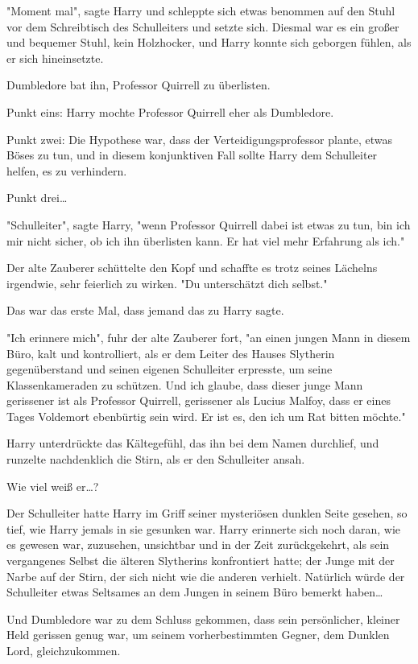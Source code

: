 {"Moment mal", sagte Harry und schleppte sich etwas benommen auf den Stuhl vor dem Schreibtisch des Schulleiters und setzte sich. Diesmal war es ein großer und bequemer Stuhl, kein Holzhocker, und Harry konnte sich geborgen fühlen, als er sich hineinsetzte.

Dumbledore bat ihn, Professor Quirrell zu überlisten.

Punkt eins: Harry mochte Professor Quirrell eher als Dumbledore.

Punkt zwei: Die Hypothese war, dass der Verteidigungsprofessor plante, etwas Böses zu tun, und in diesem konjunktiven Fall sollte Harry dem Schulleiter helfen, es zu verhindern.

Punkt drei…

"Schulleiter", sagte Harry, "wenn Professor Quirrell dabei ist etwas zu tun, bin ich mir nicht sicher, ob ich ihn überlisten kann. Er hat viel mehr Erfahrung als ich."

Der alte Zauberer schüttelte den Kopf und schaffte es trotz seines Lächelns irgendwie, sehr feierlich zu wirken. "Du unterschätzt dich selbst."

Das war das erste Mal, dass jemand das zu Harry sagte.

"Ich erinnere mich", fuhr der alte Zauberer fort, "an einen jungen Mann in diesem Büro, kalt und kontrolliert, als er dem Leiter des Hauses Slytherin gegenüberstand und seinen eigenen Schulleiter erpresste, um seine Klassenkameraden zu schützen. Und ich glaube, dass dieser junge Mann gerissener ist als Professor Quirrell, gerissener als Lucius Malfoy, dass er eines Tages Voldemort ebenbürtig sein wird. Er ist es, den ich um Rat bitten möchte."

Harry unterdrückte das Kältegefühl, das ihn bei dem Namen durchlief, und runzelte nachdenklich die Stirn, als er den Schulleiter ansah.

Wie viel weiß er…?

Der Schulleiter hatte Harry im Griff seiner mysteriösen dunklen Seite gesehen, so tief, wie Harry jemals in sie gesunken war. Harry erinnerte sich noch daran, wie es gewesen war, zuzusehen, unsichtbar und in der Zeit zurückgekehrt, als sein vergangenes Selbst die älteren Slytherins konfrontiert hatte; der Junge mit der Narbe auf der Stirn, der sich nicht wie die anderen verhielt. Natürlich würde der Schulleiter etwas Seltsames an dem Jungen in seinem Büro bemerkt haben…

Und Dumbledore war zu dem Schluss gekommen, dass sein persönlicher, kleiner Held gerissen genug war, um seinem vorherbestimmten Gegner, dem Dunklen Lord, gleichzukommen.

}
